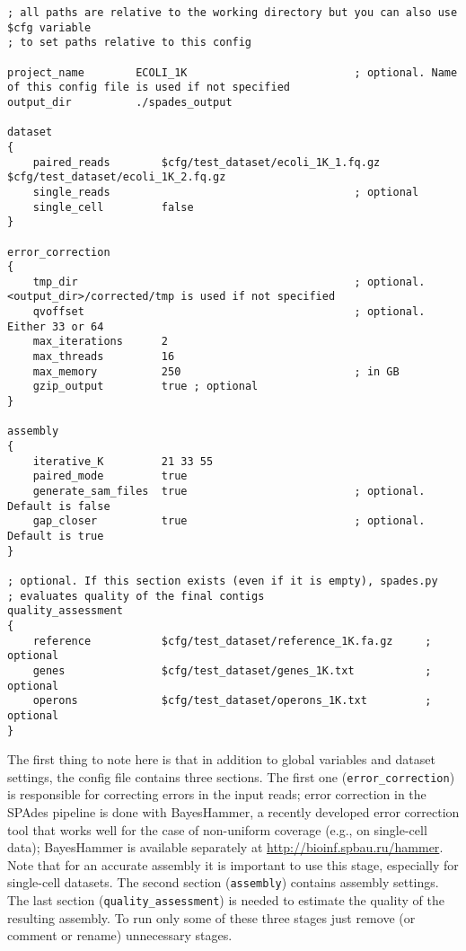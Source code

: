 \documentclass{article}
\def\spades{SPAdes}
\def\bh{BayesHammer}
\begin{document}
\begin{lstlisting}													
; all paths are relative to the working directory but you can also use $cfg variable 
; to set paths relative to this config

project_name        ECOLI_1K                          ; optional. Name of this config file is used if not specified
output_dir          ./spades_output

dataset
{
    paired_reads        $cfg/test_dataset/ecoli_1K_1.fq.gz $cfg/test_dataset/ecoli_1K_2.fq.gz
    single_reads                                      ; optional
    single_cell         false
}

error_correction
{
    tmp_dir                                           ; optional. <output_dir>/corrected/tmp is used if not specified
    qvoffset                                          ; optional. Either 33 or 64
    max_iterations      2
    max_threads         16
    max_memory          250                           ; in GB
    gzip_output         true ; optional
}

assembly
{
    iterative_K         21 33 55
    paired_mode         true
    generate_sam_files  true                          ; optional. Default is false
    gap_closer          true                          ; optional. Default is true
}

; optional. If this section exists (even if it is empty), spades.py 
; evaluates quality of the final contigs
quality_assessment      
{
    reference           $cfg/test_dataset/reference_1K.fa.gz     ; optional
    genes               $cfg/test_dataset/genes_1K.txt           ; optional
    operons             $cfg/test_dataset/operons_1K.txt         ; optional
}
\end{lstlisting}

The first thing to note here is that in addition to global variables and dataset settings,
the config file contains three sections. The first one ({\tt error\_correction}) is responsible for correcting errors in the input reads;
error correction in the {\spades} pipeline is done with {\bh}, a recently developed error correction tool that works well for the case of non-uniform coverage
(e.g., on single-cell data); {\bh} is available separately at \url{http://bioinf.spbau.ru/hammer}.
Note that for an accurate assembly it is important to use this stage, especially for single-cell datasets.
The second section ({\tt assembly}) contains assembly settings. The last section ({\tt quality\_assessment})
is needed to estimate the quality of the resulting assembly. To run only some of these three stages just remove (or comment or rename) unnecessary stages.
\end{document}
